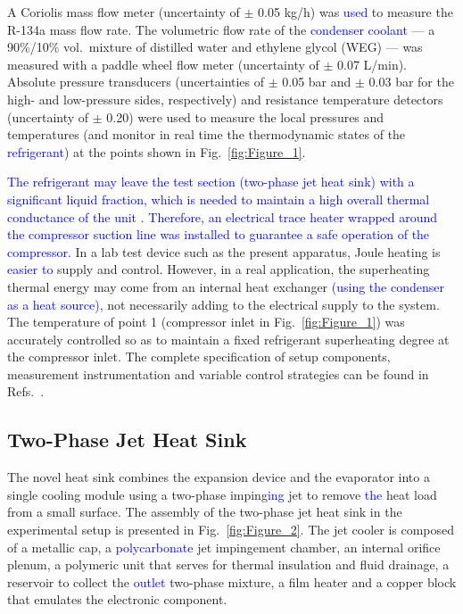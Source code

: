 \documentclass[review,preprint,12pt]{elsarticle}
\begin{document}
A Coriolis mass flow meter (uncertainty of $\pm$ 0.05 kg/h) was \textcolor{blue}{used} to measure the R-134a mass flow rate. The volumetric flow rate of the \textcolor{blue}{condenser coolant} --- a 90\%/10\% vol.~mixture of distilled water and ethylene glycol (WEG) --- was measured with a paddle wheel flow meter (uncertainty of $\pm$ 0.07 L/min). Absolute pressure transducers (uncertainties of $\pm$ 0.05 bar and $\pm$ 0.03 bar for the high- and low-pressure sides, respectively) and resistance temperature detectors (uncertainty of $\pm$ 0.20\textcelsius) were used to measure the local pressures and temperatures (and monitor in real time the thermodynamic states of the \textcolor{blue}{refrigerant}) at the points shown in Fig.~\ref{fig:Figure_1}. 

%

\textcolor{blue}{The refrigerant may leave the test section (two-phase jet heat sink) with a significant liquid fraction, which is needed to maintain a high overall thermal conductance of the unit \cite{OliveiraBarbosaJr.2016}. Therefore, an electrical trace heater wrapped around the compressor suction line was installed to guarantee a safe operation of the compressor.} In a lab test device such as the present apparatus, Joule heating is \textcolor{blue}{easier to} supply and control. However, in a real application, the superheating thermal energy may come from an internal heat exchanger  \textcolor{blue}{(using the condenser as a heat source)}, not necessarily adding to the electrical supply to the system. The temperature of point 1 (compressor inlet in Fig.~\ref{fig:Figure_1}) was accurately controlled so as to maintain a fixed refrigerant superheating degree at the compressor inlet. The complete specification of setup components, measurement instrumentation and variable control strategies can be found in Refs.~\cite{OliveiraBarbosaJr.2016,Oliveira2016}.


\subsection{Two-Phase Jet Heat Sink}
\label{sec:Jet_Cooler}

The novel heat sink combines the expansion device and the evaporator into a single cooling module using a two-phase imping\textcolor{blue}{ing} jet to remove \textcolor{blue}{the} heat load from a small surface. The assembly of the two-phase jet heat sink in the experimental setup is presented in Fig.~\ref{fig:Figure_2}. The jet cooler is composed of a metallic cap, a \textcolor{blue}{polycarbonate} jet impingement chamber, an internal orifice plenum, a polymeric unit that serves for thermal insulation and fluid drainage, a reservoir to collect the  \textcolor{blue}{outlet} two-phase mixture, a film heater and a copper block that emulates the electronic component. 
\end{document}
